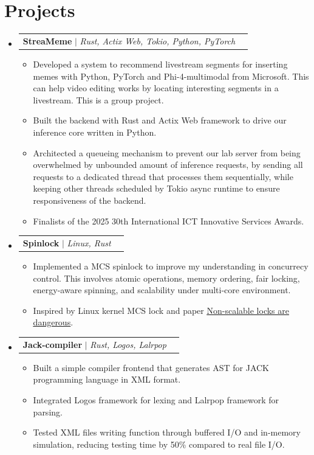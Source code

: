 \documentclass[letterpaper,11pt]{article}
\makeatletter
\newcommand{\resumeItem}[1]{
  \item\small{
    {#1 \vspace{-2pt}}
  }
}
\newcommand{\resumeProjectHeading}[2]{
    \item
    \begin{tabular*}{0.97\textwidth}{l@{\extracolsep{\fill}}r}
      \small#1 & #2 \\
    \end{tabular*}\vspace{-7pt}
}
\newcommand{\resumeSubHeadingListStart}{\begin{itemize}[leftmargin=0.15in, label={}]}
\newcommand{\resumeSubHeadingListEnd}{\end{itemize}}
\newcommand{\resumeItemListStart}{\begin{itemize}}
\newcommand{\resumeItemListEnd}{\end{itemize}\vspace{-5pt}}
\makeatother
\begin{document}
\section{Projects}
\resumeSubHeadingListStart
\resumeProjectHeading
{\textbf{StreaMeme} $|$ \emph{Rust, Actix Web, Tokio, Python, PyTorch}}{}
\resumeItemListStart
\resumeItem{Developed a system to recommend livestream
	segments for inserting memes with Python, PyTorch and Phi-4-multimodal from Microsoft.
	This can help video editing works by locating interesting segments in a livestream. This is a group project.}
\resumeItem{Built the backend with Rust and Actix Web framework to drive our inference
	core written in Python.}
\resumeItem{Architected a queueing mechanism to prevent our lab server from being
	overwhelmed by unbounded amount of inference requests, by sending all requests to a
	dedicated thread that processes them sequentially, while keeping other threads scheduled
	by Tokio async runtime to ensure responsiveness of the backend.}
\resumeItem{Finalists of the 2025 30th International ICT Innovative Services Awards.}
\resumeItemListEnd

\resumeProjectHeading
{\textbf{Spinlock} $|$ \emph{Linux, Rust}}{}
\resumeItemListStart
\resumeItem{Implemented a MCS spinlock to improve my understanding in concurrecy control. This
	involves atomic operations, memory ordering, fair locking, energy-aware spinning, and
	scalability under multi-core environment.}
\resumeItem{Inspired by Linux kernel MCS lock and paper
	\href{https://people.csail.mit.edu/nickolai/papers/boyd-wickizer-locks.pdf}{\underline{Non-scalable locks are dangerous}}.}
\resumeItemListEnd

\resumeProjectHeading
{\textbf{Jack-compiler} $|$ \emph{Rust, Logos, Lalrpop}}{}
\resumeItemListStart
\resumeItem{Built a simple compiler frontend that generates AST for JACK programming language in XML format.}
\resumeItem{Integrated Logos framework for lexing and Lalrpop framework for parsing.}
\resumeItem{Tested XML files writing function through buffered I/O and in-memory simulation, reducing
	testing time by 50\% compared to real file I/O.}
\resumeItemListEnd

\resumeSubHeadingListEnd


%


\end{document}

